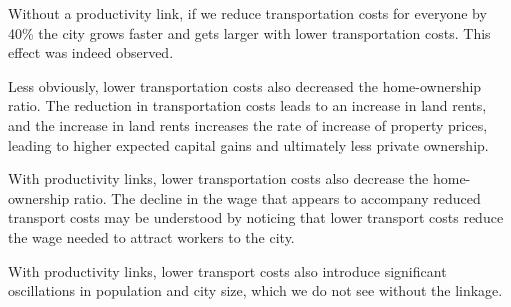 Without a productivity link, if we reduce transportation costs for everyone by 40\% the city grows faster and gets larger with lower transportation costs. This effect was indeed observed. 

Less obviously, lower transportation costs also decreased the home-ownership ratio. The reduction in transportation costs leads to an increase in land rents, and the increase in land rents increases the rate of increase of property prices, leading to higher expected capital gains and ultimately less private ownership. 

With productivity links, lower transportation costs also decrease the home-ownership ratio. 
The decline in the wage that appears to accompany reduced transport costs may be understood by noticing that lower transport costs reduce the wage needed to attract workers to the city. 

With productivity links, lower transport costs also introduce significant oscillations in population and city size, which we do not see without the linkage. 



\newpage
